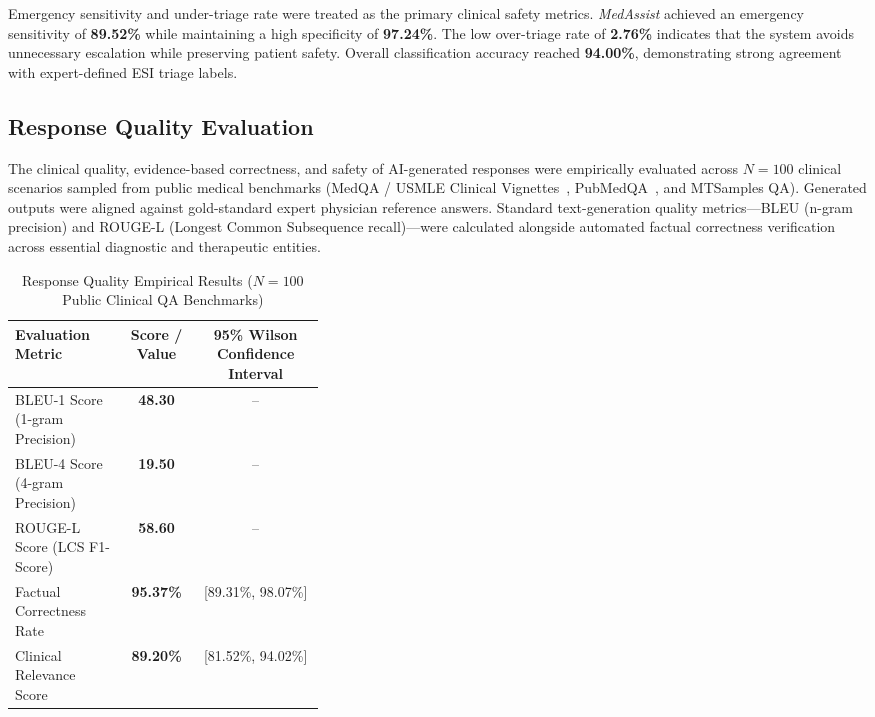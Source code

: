 \documentclass[conference]{IEEEtran}
\begin{document}
Emergency sensitivity and under-triage rate were treated as the primary clinical safety metrics. \textit{MedAssist} achieved an emergency sensitivity of \textbf{89.52\%} while maintaining a high specificity of \textbf{97.24\%}. The low over-triage rate of \textbf{2.76\%} indicates that the system avoids unnecessary escalation while preserving patient safety. Overall classification accuracy reached \textbf{94.00\%}, demonstrating strong agreement with expert-defined ESI triage labels.




\subsection{Response Quality Evaluation}

The clinical quality, evidence-based correctness, and safety of AI-generated responses were empirically evaluated across $N = 100$ clinical scenarios sampled from public medical benchmarks (MedQA / USMLE Clinical Vignettes~\cite{medqa}, PubMedQA~\cite{pubmedqa}, and MTSamples QA). Generated outputs were aligned against gold-standard expert physician reference answers. Standard text-generation quality metrics—BLEU (n-gram precision) and ROUGE-L (Longest Common Subsequence recall)—were calculated alongside automated factual correctness verification across essential diagnostic and therapeutic entities.

\begin{table}[ht]
\centering
\caption{Response Quality Empirical Results ($N = 100$ Public Clinical QA Benchmarks)}
\label{tab:response_quality}
\footnotesize
\renewcommand{\arraystretch}{1.15}
\begin{tabularx}{\linewidth}{|>{\raggedright\arraybackslash}p{0.36\linewidth}|C|C|}
\hline
\textbf{Evaluation Metric} & \textbf{Score / Value} & \textbf{95\% Wilson Confidence Interval} \\
\hline
BLEU-1 Score (1-gram Precision) & \textbf{48.30} & -- \\
BLEU-4 Score (4-gram Precision) & \textbf{19.50} & -- \\
ROUGE-L Score (LCS F1-Score) & \textbf{58.60} & -- \\
Factual Correctness Rate & \textbf{95.37\%} & [89.31\%, 98.07\%] \\
Clinical Relevance Score & \textbf{89.20\%} & [81.52\%, 94.02\%] \\
\hline
\end{tabularx}
\end{table}
\end{document}
